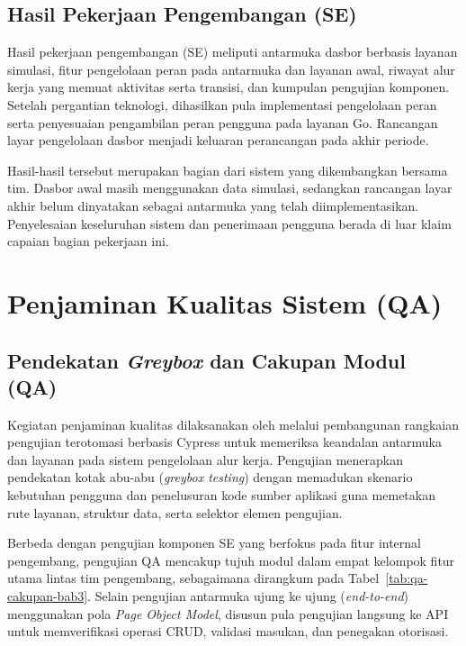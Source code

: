\subsection{Hasil Pekerjaan Pengembangan (SE)}
Hasil pekerjaan pengembangan (SE) meliputi antarmuka dasbor berbasis layanan simulasi, fitur pengelolaan peran pada antarmuka dan layanan awal, riwayat alur kerja yang memuat aktivitas serta transisi, dan kumpulan pengujian komponen. Setelah pergantian teknologi, dihasilkan pula implementasi pengelolaan peran serta penyesuaian pengambilan peran pengguna pada layanan Go. Rancangan layar pengelolaan dasbor menjadi keluaran perancangan pada akhir periode.

Hasil-hasil tersebut merupakan bagian dari sistem yang dikembangkan bersama tim. Dasbor awal masih menggunakan data simulasi, sedangkan rancangan layar akhir belum dinyatakan sebagai antarmuka yang telah diimplementasikan. Penyelesaian keseluruhan sistem dan penerimaan pengguna berada di luar klaim capaian bagian pekerjaan ini.

\section{Penjaminan Kualitas Sistem (QA)}\label{sec:qa-bab3}
\subsection{Pendekatan \textit{Greybox} dan Cakupan Modul (QA)}
Kegiatan penjaminan kualitas dilaksanakan oleh \NamaFrederiko{} melalui pembangunan rangkaian pengujian terotomasi berbasis Cypress untuk memeriksa keandalan antarmuka dan layanan pada sistem pengelolaan alur kerja. Pengujian menerapkan pendekatan kotak abu-abu (\textit{greybox testing}) dengan memadukan skenario kebutuhan pengguna dan penelusuran kode sumber aplikasi guna memetakan rute layanan, struktur data, serta selektor elemen pengujian.

Berbeda dengan pengujian komponen SE yang berfokus pada fitur internal pengembang, pengujian QA mencakup tujuh modul dalam empat kelompok fitur utama lintas tim pengembang, sebagaimana dirangkum pada Tabel~\ref{tab:qa-cakupan-bab3}. Selain pengujian antarmuka ujung ke ujung (\textit{end-to-end}) menggunakan pola \textit{Page Object Model}, disusun pula pengujian langsung ke API untuk memverifikasi operasi CRUD, validasi masukan, dan penegakan otorisasi.

